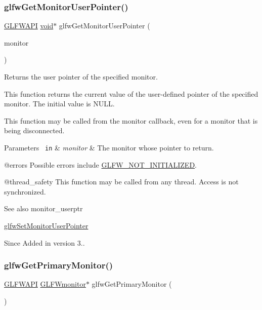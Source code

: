 \subsubsection{\texorpdfstring{glfwGetMonitorUserPointer()}{glfwGetMonitorUserPointer()}}
{\footnotesize\ttfamily \mbox{\hyperlink{glfw3_8h_a56da5036b2cc259351ae22fd6439bb47}{G\+L\+F\+W\+A\+PI}} \mbox{\hyperlink{glad_8h_a950fc91edb4504f62f1c577bf4727c29}{void}}$\ast$ glfw\+Get\+Monitor\+User\+Pointer (\begin{DoxyParamCaption}\item[{\mbox{\hyperlink{group__monitor_ga8d9efd1cde9426692c73fe40437d0ae3}{G\+L\+F\+Wmonitor}} $\ast$}]{monitor }\end{DoxyParamCaption})}



Returns the user pointer of the specified monitor. 

This function returns the current value of the user-\/defined pointer of the specified monitor. The initial value is {\ttfamily N\+U\+LL}.

This function may be called from the monitor callback, even for a monitor that is being disconnected.


\begin{DoxyParams}[1]{Parameters}
\mbox{\texttt{ in}}  & {\em monitor} & The monitor whose pointer to return.\\
\hline
\end{DoxyParams}
@errors Possible errors include \mbox{\hyperlink{group__errors_ga2374ee02c177f12e1fa76ff3ed15e14a}{G\+L\+F\+W\+\_\+\+N\+O\+T\+\_\+\+I\+N\+I\+T\+I\+A\+L\+I\+Z\+ED}}.

@thread\+\_\+safety This function may be called from any thread. Access is not synchronized.

\begin{DoxySeeAlso}{See also}
monitor\+\_\+userptr 

\mbox{\hyperlink{group__monitor_ga6d89c74c1c293f0ab78a00c3c6d1ae44}{glfw\+Set\+Monitor\+User\+Pointer}}
\end{DoxySeeAlso}
\begin{DoxySince}{Since}
Added in version 3.. 
\end{DoxySince}
\mbox{\label{group__monitor_ga59ea49f377fe701dd76764183e64d9f4}} 
\subsubsection{\texorpdfstring{glfwGetPrimaryMonitor()}{glfwGetPrimaryMonitor()}}
{\footnotesize\ttfamily \mbox{\hyperlink{glfw3_8h_a56da5036b2cc259351ae22fd6439bb47}{G\+L\+F\+W\+A\+PI}} \mbox{\hyperlink{group__monitor_ga8d9efd1cde9426692c73fe40437d0ae3}{G\+L\+F\+Wmonitor}}$\ast$ glfw\+Get\+Primary\+Monitor (\begin{DoxyParamCaption}\item[{\mbox{\hyperlink{glad_8h_a950fc91edb4504f62f1c577bf4727c29}{void}}}]{ }\end{DoxyParamCaption})}



